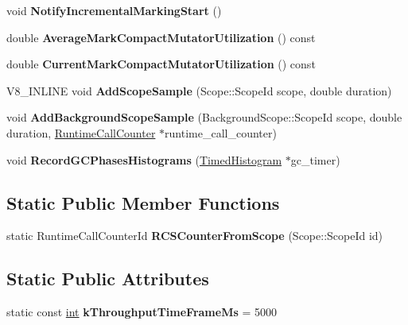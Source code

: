 \begin{DoxyCompactItemize}
void {\bfseries Notify\+Incremental\+Marking\+Start} ()
\item 
\mbox{\label{classv8_1_1internal_1_1GCTracer_a2b227eae69928e17ba4b79f3b151f913}} 
double {\bfseries Average\+Mark\+Compact\+Mutator\+Utilization} () const
\item 
\mbox{\label{classv8_1_1internal_1_1GCTracer_a3ba96f73b717eadccf7ff065f67dcca1}} 
double {\bfseries Current\+Mark\+Compact\+Mutator\+Utilization} () const
\item 
\mbox{\label{classv8_1_1internal_1_1GCTracer_af3e3f7ff3daccc22f5a440d4f0c94656}} 
V8\+\_\+\+I\+N\+L\+I\+NE void {\bfseries Add\+Scope\+Sample} (Scope\+::\+Scope\+Id scope, double duration)
\item 
\mbox{\label{classv8_1_1internal_1_1GCTracer_af400573436f50a9a560f07ae44dad09f}} 
void {\bfseries Add\+Background\+Scope\+Sample} (Background\+Scope\+::\+Scope\+Id scope, double duration, \mbox{\hyperlink{classv8_1_1internal_1_1RuntimeCallCounter}{Runtime\+Call\+Counter}} $\ast$runtime\+\_\+call\+\_\+counter)
\item 
\mbox{\label{classv8_1_1internal_1_1GCTracer_a018f6cbda202f74f1163164b3f40df2d}} 
void {\bfseries Record\+G\+C\+Phases\+Histograms} (\mbox{\hyperlink{classv8_1_1internal_1_1TimedHistogram}{Timed\+Histogram}} $\ast$gc\+\_\+timer)
\end{DoxyCompactItemize}
\subsection*{Static Public Member Functions}
\begin{DoxyCompactItemize}
\item 
\mbox{\label{classv8_1_1internal_1_1GCTracer_a81066458eab4635ad816486b7cf3c6e3}} 
static Runtime\+Call\+Counter\+Id {\bfseries R\+C\+S\+Counter\+From\+Scope} (Scope\+::\+Scope\+Id id)
\end{DoxyCompactItemize}
\subsection*{Static Public Attributes}
\begin{DoxyCompactItemize}
\item 
\mbox{\label{classv8_1_1internal_1_1GCTracer_af8ae0017f798fdca080409e71490110e}} 
static const \mbox{\hyperlink{classint}{int}} {\bfseries k\+Throughput\+Time\+Frame\+Ms} = 5000
\end{DoxyCompactItemize}


